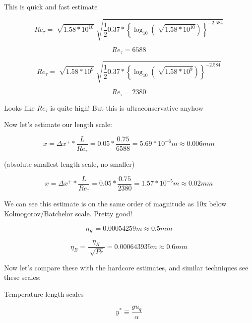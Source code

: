 \documentclass[12pt]{article}
\renewcommand{\_}{\kern-1.5pt\textunderscore\kern-1.5pt}
\begin{document}
This is quick and fast estimate\par

 \[ Re_{ \tau}=\sqrt[]{1.58\ast10^{10}}\sqrt[]{\frac{1}{2}0.37\ast \left\{ \log _{10} \left( \sqrt[]{1.58\ast10^{10}} \right)  \right\rbrace ^{-2.584}} \] \par

 \[ Re_{ \tau}=6588 \] \par

 \[ Re_{ \tau}=\sqrt[]{1.58\ast10^{9}}\sqrt[]{\frac{1}{2}0.37\ast \left\{ \log _{10} \left( \sqrt[]{1.58\ast10^{9}} \right)  \right\rbrace ^{-2.584}} \] \par

 \[ Re_{ \tau}=2380 \] \par

Looks like  \( Re_{ \tau} \)  is quite high! But this is ultraconservative anyhow\par

Now let’s estimate our length scale:\par

 \[ x= \Delta x^{+}\ast\frac{L}{Re_{ \tau}}=0.05\ast\frac{0.75}{6588}=5.69\ast10^{-6}m \approx 0.006 mm \] \par

(absolute smallest length scale, no smaller)\par

 \[ x= \Delta x^{+}\ast\frac{L}{Re_{ \tau}}=0.05\ast\frac{0.75}{2380}=1.57\ast10^{-5}m \approx 0.02 mm \] \par

We can see this estimate is on the same order of magnitude as 10x below Kolmogorov/Batchelor scale. Pretty good!\par

 \[  \eta _{K}=0.00054259 m \approx 0.5 mm \] \par

 \[  \eta _{B}=\frac{ \eta _{K}}{\sqrt[]{Pr}}=0.000643935 m \approx 0.6 mm \] \par


\vspace{\baselineskip}
Now let’s compare these with the hardcore estimates, and similar techniques see these scales:\par

Temperature length scales\par

 \[ y^{\ast} \equiv \frac{yu_{q}}{ \alpha } \] \par
\end{document}
